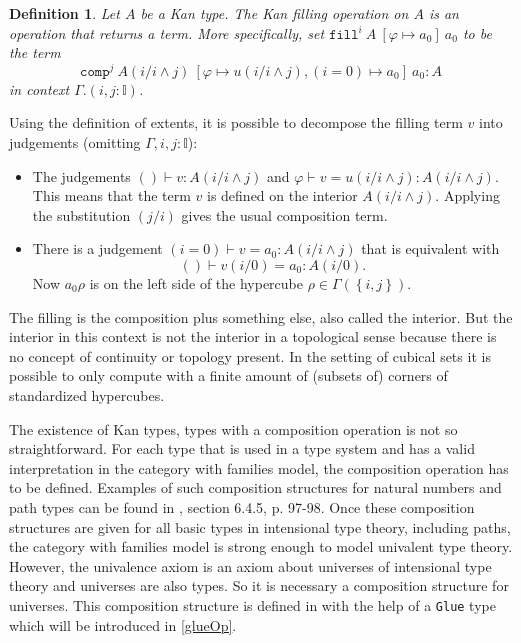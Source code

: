 \documentclass[12pt,a4paper,twoside,xetex]{book} %
\newcommand{\keyword}[1]{\emph{#1}\index{#1}}
\newtheorem{definition}[theorem]{Definition}
\newcommand{\op}[1]{\mathtt{#1}}
\newcommand{\fillt}[5]{\op{fill}^{#1} \ {#2} \ \left[{#3} \mapsto {#5} \right] \ {#5}}
\begin{document}
\begin{definition}\label{filldef}
Let $A$ be a Kan type. The Kan \keyword{filling} operation on $A$ is an 
operation that returns a term. More specifically, set 
$\fillt{i}{A}{\varphi}{u}{a_0}$ to be the term $$\op{comp}^j \ A(i/i \wedge j) 
\ \left[\varphi \mapsto u(i/i \wedge j), (i=0) \mapsto a_0 \right] \ a_0 : A $$ 
in context $\Gamma . (i, j: \mathbb{I})$.
\end{definition}

Using the definition of extents, it is possible to decompose the filling term 
$v$ into judgements (omitting $\Gamma, i,j : \mathbb{I}$):

\begin{itemize}

\item The judgements $()\vdash v : A(i/i \wedge j)$ and $\varphi \vdash v = 
u(i/i \wedge j) : A(i/i \wedge j)$. 
This means that the term $v$ is defined on the interior $A(i/i \wedge j)$. 
Applying the substitution $(j/i)$ gives the usual composition term.

\item There is a judgement $(i = 0) \vdash v = a_0 : A(i/i \wedge j)$ that is 
equivalent with $$() \vdash v(i/0) = a_0 : A(i/0).$$
Now $a_0\rho$ is on the left side of the hypercube $\rho \in \Gamma \left( 
\left\{i,j\right\} \right)$.

\end{itemize}

The filling is the composition plus something else, also called the interior. 
But the interior in this context is not the interior in a topological sense 
because there is no concept of continuity or topology present. In the setting of cubical sets it is 
possible to only compute with a finite amount of (subsets of) corners of 
standardized hypercubes.

The existence of Kan types, types with a composition operation is not so 
straightforward. For each type that is used in a type system and has a valid 
interpretation in the category with families model, the composition operation 
has to be defined. Examples of such composition structures for natural numbers 
and path types can be found in \cite{Huber2016}, section 6.4.5, p. 97-98. Once 
these composition structures are given for all basic types in intensional type 
theory, including paths, the category with families model is strong enough to 
model univalent type theory. However, the univalence axiom is an axiom about 
universes of intensional type theory and universes are also types. So it is 
necessary a composition structure for universes. This composition structure is 
defined in \cite{Huber2016} with the help of a \texttt{Glue} type which will be 
introduced in \cref{glueOp}. 
\end{document}
